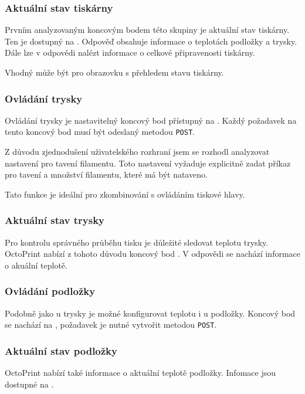 \subsubsection*{Aktuální stav tiskárny}

Prvním analyzovaným koncovým bodem této skupiny je aktuální stav tiskárny.
Ten je dostupný na .
Odpověď obsahuje informace o teplotách podložky a trysky.
Dále lze v odpovědi nalézt informace o celkové připravenosti tiskárny.

Vhodný může být pro obrazovku s přehledem stavu tiskárny.

\subsubsection*{Ovládání trysky}

Ovládání trysky je nastavitelný koncový bod přístupný na .
Každý požadavek na tento koncový bod musí být odeslaný metodou \texttt{POST}.

Z důvodu zjednodušení uživatelského rozhraní jsem se rozhodl analyzovat nastavení pro tavení filamentu.
Toto nastavení vyžaduje explicitně zadat příkaz pro tavení a množství filamentu, které má být nataveno.

Tato funkce je ideální pro zkombinování s ovládáním tiskové hlavy.

\subsubsection*{Aktuální stav trysky}

Pro kontrolu správného průběhu tisku je důležité sledovat teplotu trysky.
OctoPrint nabízí z tohoto důvodu koncový bod .
V odpovědi se nachází informace o akuální teplotě.

\subsubsection*{Ovládání podložky}

Podobně jako u trysky je možné konfigurovat teplotu i u podložky.
Koncový bod se nachází na , požadavek je nutné vytvořit metodou \texttt{POST}.

\subsubsection*{Aktuální stav podložky}

OctoPrint nabízí také informace o aktuální teplotě podložky.
Infomace jsou dostupné na .

